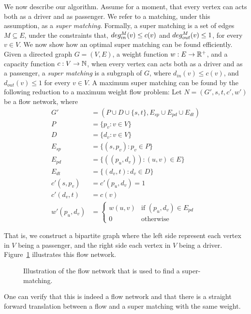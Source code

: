 We now describe our algorithm. 
Assume for a moment, 
that every vertex can acts both as a driver and as passenger.
We refer to a matching, under this assumption, as a \emph{super matching}.
Formally, a super matching is a set of edges $M \subseteq E$, 
under the constraints that, $deg^M_{in}(v) \leq c(v)$ and $deg^M_{out}(v) \leq 1$,
for every $v \in V$. 
We now show how an optimal super matching can be found efficiently.
Given a directed graph $G = (V, E)$,
a weight function $w : E \rightarrow \mathbb{R^+}$,
and a capacity function $c : V \rightarrow \mathbb{N}$, 
when every vertex can acts both as a driver and as a passenger, 
a \emph{super matching} is a subgraph of $G$, 
where $d_{in}(v) \leq c(v)$, and $d_{out}(v) \leq 1$ for every $v \in V$. 
A maximum super matching can be found by the following reduction 
to a maximum weight flow problem: 
Let $N = (G', s, t, c', w')$ be a flow network, where 
\begin{align*}
G'				& = (P \cup D \cup \{s, t\}, E_{sp} \cup E_{pd} \cup E_{dt})	\\
P				& = \{p_v : v \in V\}					\\
D				& = \{d_v : v \in V\}					\\
E_{sp}			& = \{ (s, p_v) : p_v \in P \}			\\
E_{pd}			& = \{ ((p_u, d_v)) : (u, v) \in E \}	\\
E_{dt}			& = \{ (d_v, t) : d_v \in D \}			\\
c'(s, p_v)		& = c'(p_u, d_v) = 1					\\
c'(d_v, t)		& = c(v)								\\
w'(p_u, d_v)	& = 
\begin{cases}
w(u, v) & \text{if } (p_u, d_v) \in E_{pd} \\
0 & \text{otherwise}	
\end{cases}
\end{align*}

That is, 
we construct a bipartite graph where the left side represent each vertex 
in $V$ being a passenger,
and the right side each vertex in $V$ being a driver.
Figure~\ref{fig:cm-flow} illustrates this flow network.
%
\begin{figure}
\centering

\caption{
\label{fig:cm-flow}
Illustration of the flow network that is used to find a super-matching.
}
\end{figure}
%
One can verify that this is indeed a flow network and that there is a straight forward 
translation between a flow and a super matching with the same weight.

